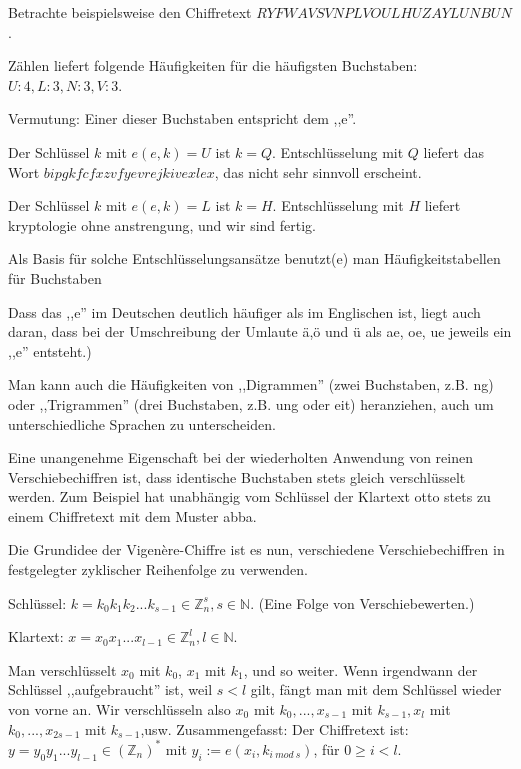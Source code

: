 \documentclass[a4paper]{article}
\begin{document}
\begin{multicols}{3}
    Betrachte beispielsweise den Chiffretext $RYFWAVSVNPLVOULHUZAYLUNBUN$.
    \begin{itemize*}
        \item Zählen liefert folgende Häufigkeiten für die häufigsten Buchstaben: $U:4,L:3,N:3,V:3$.
        \item Vermutung: Einer dieser Buchstaben entspricht dem ,,e''.
        \item Der Schlüssel $k$ mit $e(e,k)=U$ ist $k=Q$. Entschlüsselung mit $Q$ liefert das Wort $bipgkfcfxzvfyevrejkivexlex$, das nicht sehr sinnvoll erscheint.
        \item Der Schlüssel $k$ mit $e(e,k)=L$ ist $k=H$. Entschlüsselung mit $H$ liefert kryptologie ohne anstrengung, und wir sind fertig.
        \item Als Basis für solche Entschlüsselungsansätze benutzt(e) man Häufigkeitstabellen für Buchstaben
        \item Dass das ,,e'' im Deutschen deutlich häufiger als im Englischen ist, liegt auch daran, dass bei der Umschreibung der Umlaute ä,ö und ü als ae, oe, ue jeweils ein ,,e'' entsteht.)
    \end{itemize*}

    Man kann auch die Häufigkeiten von ,,Digrammen'' (zwei Buchstaben, z.B. ng) oder ,,Trigrammen'' (drei Buchstaben, z.B. ung oder eit) heranziehen, auch um unterschiedliche Sprachen zu unterscheiden.

    Eine unangenehme Eigenschaft bei der wiederholten Anwendung von reinen Verschiebechiffren ist, dass identische Buchstaben stets gleich verschlüsselt werden. Zum Beispiel hat unabhängig vom Schlüssel der Klartext otto stets zu einem Chiffretext mit dem Muster abba.

    Die Grundidee der Vigenère-Chiffre ist es nun, verschiedene Verschiebechiffren in festgelegter zyklischer Reihenfolge zu verwenden.

    Schlüssel: $k=k_0 k_1 k_2 ...k_{s-1}\in\mathbb{Z}^s_n,s\in\mathbb{N}$. (Eine Folge von Verschiebewerten.)

    Klartext: $x=x_0 x_1...x_{l-1} \in\mathbb{Z}^l_n,l\in\mathbb{N}$.

    Man verschlüsselt $x_0$ mit $k_0$, $x_1$ mit $k_1$, und so weiter. Wenn irgendwann der Schlüssel ,,aufgebraucht'' ist, weil $s<l$ gilt, fängt man mit dem Schlüssel wieder von vorne an. Wir verschlüsseln also $x_0$ mit $k_0,...,x_{s-1}$ mit $k_{s-1},x_l$ mit $k_0,...,x_{2s-1}$ mit $k_{s-1}$,usw.
    Zusammengefasst: Der Chiffretext ist: $y=y_0 y_1...y_{l-1}\in(\mathbb{Z}_n)^*$ mit $y_i:=e(x_i,k_{i\ mod\ s})$, für $0\geq i < l$.


\end{multicols}
\end{document}
